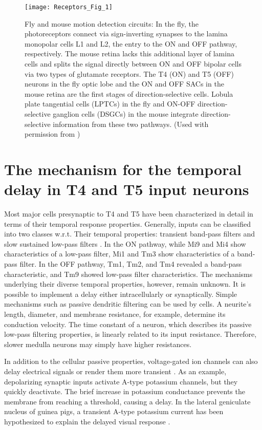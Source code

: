 \begin{figure}
\centering
\hspace*{-1cm} 
\texttt{[image: Receptors\_Fig\_1]}
\caption[Distribution of receptors and input synapses on the T4 and T5 cells] {Fly and mouse motion detection circuits: In the fly, the photoreceptors connect via sign-inverting synapses to the lamina monopolar cells L1 and L2, the entry to the ON and OFF pathway, respectively. The mouse retina lacks this additional layer of lamina cells and splits the signal directly between ON and OFF bipolar cells via two types of glutamate receptors. The T4 (ON) and T5 (OFF) neurons in the fly optic lobe and the ON and OFF SACs in the mouse retina are the first stages of direction-selective cells. Lobula plate tangential cells (LPTCs) in the fly and ON-OFF direction-selective ganglion cells (DSGCs) in the mouse integrate direction-selective information from these two pathways. (Used with permission from \cite{Borst2015})} 
\label{fig:receptors}
\end{figure}

\section{The mechanism for the temporal delay in T4 and T5 input neurons}
Most major cells presynaptic to T4 and T5 have been characterized in detail in terms of their temporal response properties. Generally, inputs can be classified into two classes w.r.t. Their temporal properties: transient band-pass filters and slow sustained low-pass filters \parencite{Arenz2017, Serbe2016}. In the ON pathway, while Mi9 and Mi4 show characteristics of a low-pass filter, Mi1 and Tm3 show characteristics of a band-pass filter. In the OFF pathway, Tm1, Tm2, and Tm4 revealed a band-pass characteristic, and Tm9 showed low-pass filter characteristics. The mechanisms underlying their diverse temporal properties, however, remain unknown. It is possible to implement a delay either intracellularly or synaptically. Simple mechanisms such as passive dendritic filtering can be used by cells. A neurite's length, diameter, and membrane resistance, for example, determine its conduction velocity. The time constant of a neuron, which describes its passive low-pass filtering properties, is linearly related to its input resistance. Therefore, slower medulla neurons may simply have higher resistances.

In addition to the cellular passive properties, voltage-gated ion channels can also delay electrical signals or render them more transient \parencite{Destexhe1999}. As an example, depolarizing synaptic inputs activate A-type potassium channels, but they quickly deactivate. The brief increase in potassium conductance prevents the membrane from reaching a threshold, causing a delay. In the lateral geniculate nucleus of guinea pigs, a transient A-type potassium current has been hypothesized to explain the delayed visual response \parencite{Mccormick1991}.

